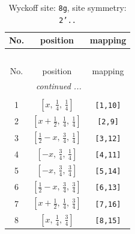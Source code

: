 \documentclass[fleqn,8pt]{jsarticle}
\begin{document}
\begin{longtable}{ccc}
\caption{Wyckoff site: {\tt 8g}, site symmetry: {\tt 2'..}}
 \\
 \hline \hline
No. & position & mapping \\ \hline \endfirsthead

\multicolumn{2}{l}{\tablename\ \thetable{}} \\
 \hline \hline
No. & position & mapping \\ \hline \endhead

 \hline \hline
\multicolumn{2}{r}{\footnotesize\it continued ...} \\ \endfoot

 \hline \hline
\multicolumn{2}{r}{} \\ \endlastfoot

1 & $\left[ x,\, \frac{1}{4},\, \frac{1}{4} \right]$ & {\tt [1,10]} \\ \hline
2 & $\left[ x + \frac{1}{2},\, \frac{1}{4},\, \frac{1}{4} \right]$ & {\tt [2,9]} \\ \hline
3 & $\left[ \frac{1}{2} - x,\, \frac{3}{4},\, \frac{1}{4} \right]$ & {\tt [3,12]} \\ \hline
4 & $\left[ - x,\, \frac{3}{4},\, \frac{1}{4} \right]$ & {\tt [4,11]} \\ \hline
5 & $\left[ - x,\, \frac{3}{4},\, \frac{3}{4} \right]$ & {\tt [5,14]} \\ \hline
6 & $\left[ \frac{1}{2} - x,\, \frac{3}{4},\, \frac{3}{4} \right]$ & {\tt [6,13]} \\ \hline
7 & $\left[ x + \frac{1}{2},\, \frac{1}{4},\, \frac{3}{4} \right]$ & {\tt [7,16]} \\ \hline
8 & $\left[ x,\, \frac{1}{4},\, \frac{3}{4} \right]$ & {\tt [8,15]} \\
\end{longtable}
\renewcommand{\arraystretch}{1.2}
\end{document}
